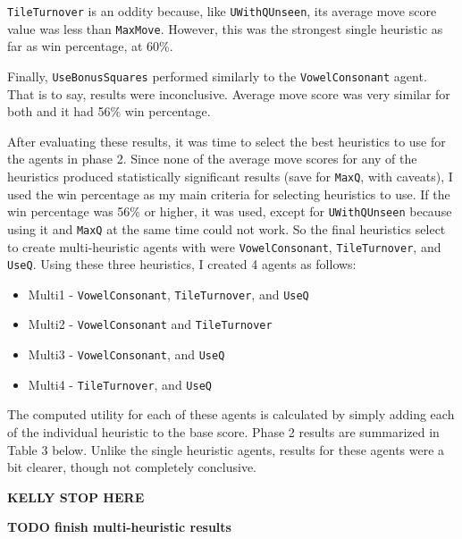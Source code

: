 \documentclass[letterpaper]{article}
\begin{document}
\texttt{TileTurnover} is an oddity because, like \texttt{UWithQUnseen}, its average move score value was less than \texttt{MaxMove}. However, this was the strongest single heuristic as far as win percentage, at 60\%.

Finally, \texttt{UseBonusSquares} performed similarly to the \texttt{VowelConsonant} agent. That is to say, results were inconclusive. Average move score was very similar for both and it had 56\% win percentage.




After evaluating these results, it was time to select the best heuristics to use for the agents in phase 2. Since none of the average move scores for any of the heuristics produced statistically significant results (save for \texttt{MaxQ}, with caveats), I used the win percentage as my main criteria for selecting heuristics to use. If the win percentage was 56\% or higher, it was used, except for \texttt{UWithQUnseen} because using it and \texttt{MaxQ} at the same time could not work. So the final heuristics select to create multi-heuristic agents with were \texttt{VowelConsonant}, \texttt{TileTurnover}, and \texttt{UseQ}. Using these three heuristics, I created 4 agents as follows:

 \begin{itemize}
  \setlength{\itemsep}{0cm}%
  \setlength{\parskip}{0cm}%
  \item Multi1 - \texttt{VowelConsonant}, \texttt{TileTurnover}, and \texttt{UseQ}
  \item Multi2 - \texttt{VowelConsonant} and \texttt{TileTurnover}
  \item Multi3 - \texttt{VowelConsonant}, and \texttt{UseQ}
  \item Multi4 - \texttt{TileTurnover}, and \texttt{UseQ}
\end{itemize}

The computed utility for each of these agents is calculated by simply adding each of the individual heuristic to the base score. Phase 2 results are summarized in Table 3 below. Unlike the single heuristic agents, results for these agents were a bit clearer, though not completely conclusive. 

\textbf{KELLY STOP HERE}


\textbf{TODO finish multi-heuristic results}
\end{document}
